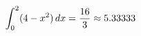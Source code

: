 \documentclass[preview]{standalone}
\begin{document}
\begin{align*}
\special{dvisvgm:raw <g id='unique000'>}\int_0^2 (4 - x^2) \, dx = \frac{16}{3} \approx 5.33333\special{dvisvgm:raw </g>}
\end{align*}
\end{document}
